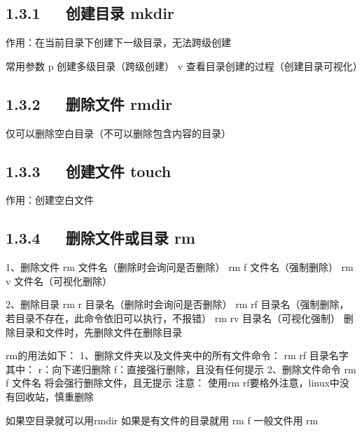 \documentclass[letterpaper,12pt,english]{sphinxmanual}
\begin{document}
\subsection{1.3.1   创建目录 mkdir}
\label{\detokenize{001software/001install/linux:mkdir}}
\begin{sphinxVerbatim}[commandchars=\\\{\}]
作用：在当前目录下创建下一级目录，无法跨级创建

常用参数
\PYGZhy{}p 创建多级目录（跨级创建）
\PYGZhy{}v 查看目录创建的过程（创建目录可视化）
\end{sphinxVerbatim}


\subsection{1.3.2   删除文件 rmdir}
\label{\detokenize{001software/001install/linux:rmdir}}
\begin{sphinxVerbatim}[commandchars=\\\{\}]
仅可以删除空白目录（不可以删除包含内容的目录）
\end{sphinxVerbatim}


\subsection{1.3.3   创建文件 touch}
\label{\detokenize{001software/001install/linux:id2}}
\begin{sphinxVerbatim}[commandchars=\\\{\}]
作用：创建空白文件
\end{sphinxVerbatim}


\subsection{1.3.4   删除文件或目录 rm}
\label{\detokenize{001software/001install/linux:id3}}
\begin{sphinxVerbatim}[commandchars=\\\{\}]
1、删除文件
rm 文件名（删除时会询问是否删除）
rm \PYGZhy{}f 文件名（强制删除）
rm \PYGZhy{}v 文件名（可视化删除）

2、删除目录
rm \PYGZhy{}r 目录名（删除时会询问是否删除）
rm \PYGZhy{}rf 目录名（强制删除，若目录不存在，此命令依旧可以执行，不报错）
rm \PYGZhy{}rv 目录名（可视化强制）
删除目录和文件时，先删除文件在删除目录

rm的用法如下：
1、删除文件夹以及文件夹中的所有文件命令：
rm \PYGZhy{}rf 目录名字
其中：
\PYGZhy{}r：向下递归删除
\PYGZhy{}f：直接强行删除，且没有任何提示
2、删除文件命令
rm \PYGZhy{}f 文件名
将会强行删除文件，且无提示
注意：
使用rm \PYGZhy{}rf要格外注意，linux中没有回收站，慎重删除

如果空目录就可以用rmdir
如果是有文件的目录就用 rm \PYGZhy{}f
一般文件用 rm
\end{sphinxVerbatim}
\end{document}
